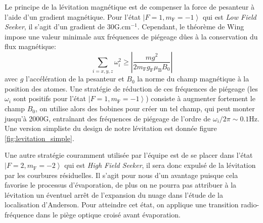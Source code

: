 Le principe de la lévitation magnétique est de compenser la force de pesanteur à l'aide d'un gradient magnétique. Pour l'état $\left| F=1, m_{\mathrm{F}}=-1 \right\rangle$ qui est \emph{Low Field Seeker}, il s'agit d'un gradient de 30G.cm${}^{-1}$. Cependant, le théorème de Wing impose une valeur minimale aux fréquences de piégeage dûes à la conservation du flux magnétique:
\begin{equation}
\sum_{i=x,y,z} \omega_i^2 \geq \left| \frac{mg^2}{2m_{\mathrm{F}} g_{\mathrm{F}} \mu_{\mathrm{B}} B_0}\right|
\label{eq:theoreme_wing}
\end{equation} 
avec $g$ l'accélération de la pesanteur et $B_0$ la norme du champ magnétique à la position des atomes. Une stratégie de réduction de ces fréquences de piégeage (les $\omega_i$ sont positifs pour l'état $\left|F=1, m_{\mathrm{F}}=-1 \right\rangle$) consiste à augmenter fortement le champ $B_0$, on utilise alors des bobines pour créer un tel champ, qui peut monter jusqu'à 2000G, entraînant des fréquences de piégeage de l'ordre de $\omega_i /2 \pi \sim 0.1$Hz. Une version simpliste du design de notre lévitation est donnée figure \ref{fig:levitation_simple}.

Une autre stratégie couramment utilisée par l'équipe est de se placer dans l'état $\left|F=2,m_{\mathrm{F}}=-2 \right\rangle$ qui est \textit{High Field Seeker}, il sera donc expulsé de la lévitation par les courbures résiduelles. Il s'agit pour nous d'un avantage puisque cela favorise le processus d'évaporation, de plus on ne pourra pas attribuer à la lévitation un éventuel arrêt de l'expansion du nuage dans l'étude de la localisation d'Anderson. Pour atteindre cet état, on applique une transition radio-fréquence dans le piège optique croisé avant évaporation.

